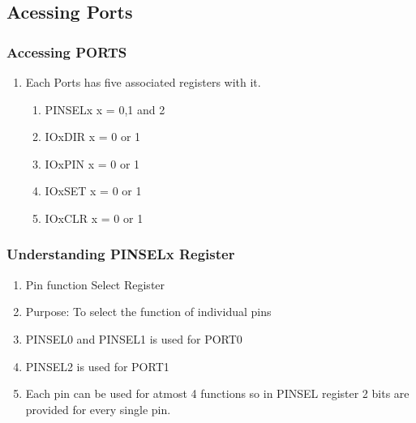 \documentclass[10pt,red]{beamer}
\begin{document}
\subsection{Acessing Ports}
\begin{frame}
	\frametitle{Accessing PORTS} \pause
		\begin{enumerate}
			\item<+-|alert@+> Each Ports has five associated registers with it.   \\[10pt]
				\begin{enumerate}
					\item<+-|alert@+> PINSELx  \hspace{25pt} x = 0,1 and 2\\[10pt]
					\item<+-|alert@+> IOxDIR \hspace{30pt} x = 0 or 1\\[10pt]
					\item<+-|alert@+> IOxPIN \hspace{30pt} x = 0 or 1\\[10pt]    
					\item<+-|alert@+> IOxSET \hspace{30pt} x = 0 or 1\\[10pt]
					\item<+-|alert@+> IOxCLR \hspace{30pt} x = 0 or 1\\[10pt]
				\end{enumerate}
		\end{enumerate}
\end{frame} 

\begin{frame}
	\frametitle{Understanding PINSELx Register} \pause
		\begin{enumerate}
			\item<+-|alert@+> Pin function Select Register   \\[10pt]
			\item<+-|alert@+> Purpose: To select the function of individual pins   \\[10pt]
			\item<+-|alert@+> PINSEL0 and PINSEL1 is used for PORT0  \\[10pt]
			\item<+-|alert@+> PINSEL2 is used for PORT1 \\[10pt]
			\item<+-|alert@+> Each pin can be used for atmost 4 functions so in PINSEL register 2 bits are provided for every single pin. \\[10pt]
		\end{enumerate}			
\end{frame}
\end{document}
